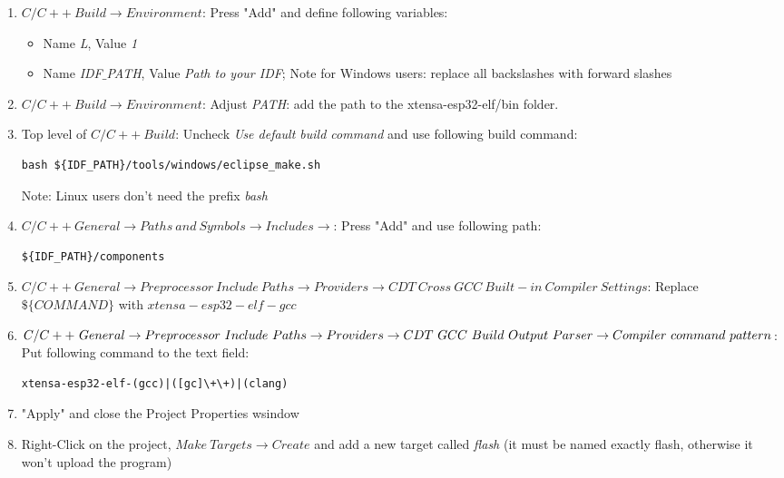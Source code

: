 \documentclass[]{scrreprt}%
\begin{document}
\begin{enumerate}
 \item $C/C++\ Build \rightarrow Environment$: Press "Add" and define following variables:
    \begin{itemize}
      \item Name \textit{L}, Value \textit{1}
      \item Name \textit{IDF$\_$PATH}, Value \textit{Path to your IDF}; Note for Windows users: replace all backslashes with forward slashes
    \end{itemize}
 \item $C/C++\ Build \rightarrow Environment$: Adjust \textit{PATH}: add the path to the xtensa-esp32-elf/bin folder. 
 \item Top level of $C/C++\ Build$: Uncheck \textit{Use default build command} and use following build command: 
    \begin{lstlisting}[frame=single]
    bash ${IDF_PATH}/tools/windows/eclipse_make.sh
    \end{lstlisting}
    Note: Linux users don't need the prefix \textit{bash}
 \item $C/C++\ General \rightarrow Paths\ and\ Symbols \rightarrow Includes \rightarrow$: Press "Add" and use following path: 
    \begin{lstlisting}[frame=single]
      ${IDF_PATH}/components 
    \end{lstlisting}
 \item $C/C++\ General \rightarrow Preprocessor\ Include\ Paths \rightarrow Providers \rightarrow CDT\ Cross\ GCC\ Built-in\ Compiler\ Settings$:  
    Replace $\$\{COMMAND\}$ with $xtensa-esp32-elf-gcc$
 \item $C/C++\ General \rightarrow Preprocessor\ Include\ Paths \rightarrow Providers \rightarrow \\ CDT\ GCC\ Build\ Output\ Parser \rightarrow 
 Compiler\ command\ pattern$: Put following command to the text field:\\
    \begin{lstlisting}[frame=single]
      xtensa-esp32-elf-(gcc)|([gc]\+\+)|(clang)
    \end{lstlisting}
 \item "Apply" and close the Project Properties wsindow
 \item Right-Click on the project, $Make\ Targets \rightarrow Create$ and add a new target called \textit{flash} (it must be named exactly flash, otherwise it won't upload the program)
\end{enumerate}
\end{document}

